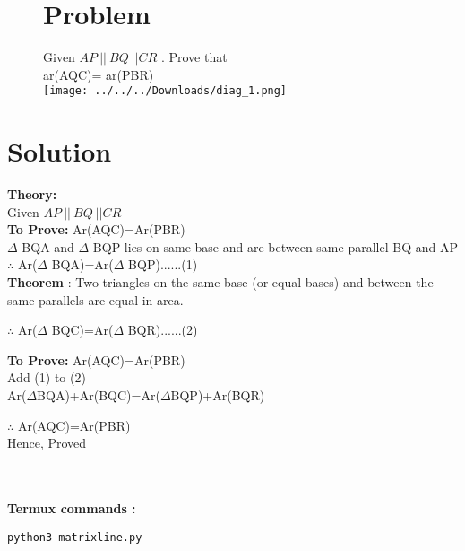 \documentclass[10pt, a4paper]{article}
\begin{document}
\title{\mytitle}
\author{\myauthor\hspace{1em}\\\contact\\FWC22036\hspace{6.5em}IITH\hspace{0.5em}\mymodule\hspace{6em}ASSIGN-4}
\date{}
	\maketitle
		\begin{figure}
	\tableofcontents
\vspace{10mm}
   \section{Problem}

   Given $ AP\: || \: BQ\: || CR $  . Prove that\\ 
   ar(AQC)= ar(PBR)\\
  
       \centering
        \texttt{[image: ../../../Downloads/diag\_1.png]}  
        \label{fig:2}
    \end{figure}
   \section{Solution}
   \textbf{Theory:}\\
   Given $ AP\: || \: BQ\: || CR $ \\
\textbf{To Prove:} Ar(AQC)=Ar(PBR) \\
$\Delta$ BQA and $\Delta$ BQP lies on same base  and are between same parallel BQ and AP\\
$\therefore$ Ar($\Delta$ BQA)=Ar($\Delta$ BQP)......(1)\\ 
\textbf{Theorem} : Two triangles on the same base (or equal bases) and between the same parallels are equal in area.
\begin{center}
$\therefore$ Ar($\Delta$ BQC)=Ar($\Delta$ BQR)......(2)\\ 
\end{center}
\textbf{To Prove:}  Ar(AQC)=Ar(PBR)\\
Add (1) to (2) \\
Ar($\Delta$BQA)+Ar(BQC)=Ar($\Delta$BQP)+Ar(BQR)
\begin{center}
$\therefore$ Ar(AQC)=Ar(PBR)     \\
Hence, Proved \\
\
\\
\
\\
\end{center}
\vspace{3mm}
\textbf{Termux commands :}
\begin{lstlisting}
python3 matrixline.py
\end{lstlisting}
\end{document}
